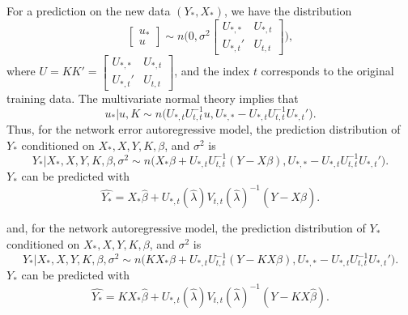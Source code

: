 \documentclass[times, doublespace]{auth}
\begin{document}
For a prediction on the new data $(Y_{*},X_{*})$, we have the distribution
\[
\begin{bmatrix} u_{*}\\u\end{bmatrix} \sim n\Bigg(0, \sigma^{2}\begin{bmatrix} U_{*,*} & U_{*,t}\\ U_{*,t}' & U_{t,t}\end{bmatrix}\Bigg),
\]
where $U = KK' = \begin{bmatrix} U_{*,*} & U_{*,t}\\ U_{*,t}' & U_{t,t}\end{bmatrix}$, and the index $t$ corresponds to the original training data. The multivariate normal theory implies that
\[
u_{*} \big\vert u, K \sim n\big(U_{*,t}U_{t,t}^{-1}u, U_{*,*} - U_{*,t}U_{t,t}^{-1}U_{*,t}'\big).
\]
Thus, for the network error autoregressive model, the prediction distribution of $Y_{*}$ conditioned on $X_{*}, X, Y, K, \beta$, and $\sigma^{2}$ is
\[
Y_{*} \big\vert X_{*}, X, Y, K, \beta, \sigma^{2} \sim n\bigg(X_{*}\beta + U_{*,t}U_{t,t}^{-1}(Y-X\beta), U_{*,*} - U_{*,t}U_{t,t}^{-1}U_{*,t}'\bigg).
\]
$Y_{*}$ can be predicted with 
\begin{equation}
\label{eqn: 14}
\hat{Y_{*}} = X_{*}\hat{\beta} + U_{*,t}(\hat{\lambda})V_{t,t}(\hat{\lambda})^{-1}(Y-X\hat{\beta}).
\end{equation}

and, for the network autoregressive model, the prediction distribution of $Y_{*}$ conditioned on $X_{*}, X, Y, K, \beta$, and $\sigma^{2}$ is
\[
Y_{*} \big\vert X_{*}, X, Y, K, \beta, \sigma^{2} \sim n\bigg(KX_{*}\beta + U_{*,t}U_{t,t}^{-1}(Y-KX\beta), U_{*,*} - U_{*,t}U_{t,t}^{-1}U_{*,t}'\bigg).
\]
$Y_{*}$ can be predicted with 
\begin{equation}
\label{eqn: 14}
\hat{Y_{*}} = KX_{*}\hat{\beta} + U_{*,t}(\hat{\lambda})V_{t,t}(\hat{\lambda})^{-1}(Y-KX\hat{\beta}).
\end{equation}
\end{document}
